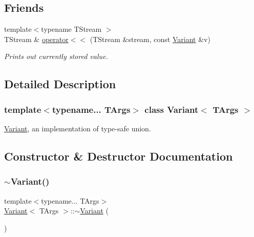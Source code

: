 \subsection*{Friends}
\begin{DoxyCompactItemize}
\item 
\hypertarget{classVariant_a55dc025016fa5ebfcc5ae6f164ebc76f}{}\label{classVariant_a55dc025016fa5ebfcc5ae6f164ebc76f} 
{\footnotesize template$<$typename T\+Stream $>$ }\\T\+Stream \& \hyperlink{classVariant_a55dc025016fa5ebfcc5ae6f164ebc76f}{operator$<$$<$} (T\+Stream \&stream, const \hyperlink{classVariant}{Variant} \&v)
\begin{DoxyCompactList}\small\item\em Prints out currently stored value. \end{DoxyCompactList}\end{DoxyCompactItemize}


\subsection{Detailed Description}
\subsubsection*{template$<$typename... T\+Args$>$\newline
class Variant$<$ T\+Args $>$}

\hyperlink{classVariant}{Variant}, an implementation of type-\/safe union. 

\subsection{Constructor \& Destructor Documentation}
\hypertarget{classVariant_af2c39ddb0ac48d6e3ec1eac09c08478d}{}\label{classVariant_af2c39ddb0ac48d6e3ec1eac09c08478d} 
\subsubsection{\texorpdfstring{$\sim$\+Variant()}{~Variant()}}
{\footnotesize\ttfamily template$<$typename... T\+Args$>$ \\
\hyperlink{classVariant}{Variant}$<$ T\+Args $>$\+::$\sim$\hyperlink{classVariant}{Variant} (\begin{DoxyParamCaption}{ }\end{DoxyParamCaption})\hspace{0.3cm}{\ttfamily [inline]}}



